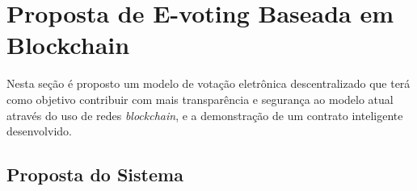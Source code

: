 \documentclass[portuguese]{textolivre}
\begin{document}
		
		
		
		
	
	\section{Proposta de E-voting Baseada em Blockchain \label{desenvolvimento}}
	
	Nesta seção é proposto um modelo de votação eletrônica descentralizado que terá como objetivo contribuir com mais transparência e segurança ao modelo atual através do uso de redes \emph{blockchain}, e a demonstração de um contrato inteligente desenvolvido.
	
	\subsection{Proposta do Sistema}
	
\end{document}
